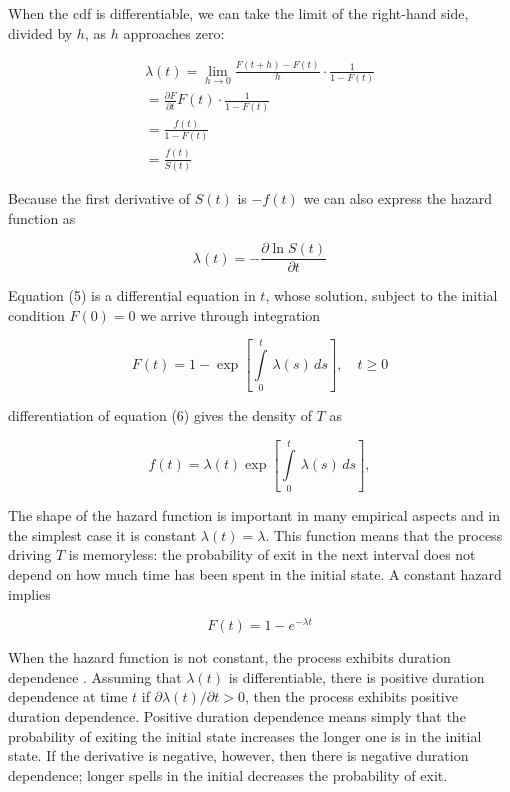 \documentclass[
  11pt,
]{article}
\numberwithin{equation}{section}
\begin{document}
When the cdf is differentiable, we can take the limit of the right-hand
side, divided by \(h\), as \(h\) approaches zero:

\begin{equation}
\begin{gathered}
\lambda(t) = \lim_{h \to 0} \frac{F(t + h) - F(t)}{h}\cdot \frac{1}{1 - F(t)} \\[8pt]
= \frac{\partial F}{\partial t}F(t) \cdot \frac{1}{1 - F(t)} \\[8pt]
= \frac{f(t)}{1 - F(t)} \\[8pt]
= \frac{f(t)}{S(t)}
\end{gathered}
\end{equation}

Because the first derivative of \(S(t)\) is \(-f(t)\) we can also
express the hazard function as

\begin{equation}
\lambda(t) = - \frac{\partial \ln S(t)}{\partial t}
\end{equation}

Equation (5) is a differential equation in \(t\), whose solution,
subject to the initial condition \(F(0) = 0\) we arrive through
integration

\begin{equation}
F(t) = 1 - \exp\left[\int\limits_{0}^{t}\,\lambda(s)\,ds \right], \quad t \geq 0
\end{equation}

differentiation of equation (6) gives the density of \(T\) as

\begin{equation}
f(t) = \lambda(t)\exp\left[\int\limits_{0}^{t}\,\lambda(s)\,ds \right],
\end{equation}

The shape of the hazard function is important in many empirical aspects
and in the simplest case it is constant \(\lambda(t) = \lambda\). This
function means that the process driving \(T\) is memoryless: the
probability of exit in the next interval does not depend on how much
time has been spent in the initial state. A constant hazard implies

\[
F(t) = 1 - e^{-\lambda t}
\]

When the hazard function is not constant, the process exhibits duration
dependence \citep{Lanc90, vdb96}. Assuming that \(\lambda(t)\) is
differentiable, there is positive duration dependence at time \(t\) if
\(\partial\lambda(t)/\partial t > 0\), then the process exhibits
positive duration dependence. Positive duration dependence means simply
that the probability of exiting the initial state increases the longer
one is in the initial state. If the derivative is negative, however,
then there is negative duration dependence; longer spells in the initial
decreases the probability of exit.
\end{document}
